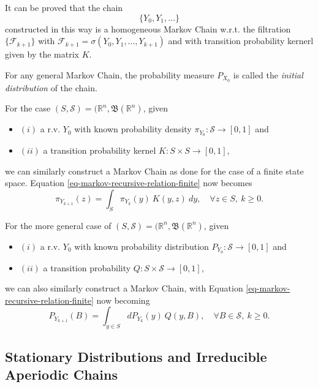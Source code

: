 It can be proved that the chain
\begin{equation*}
\{Y_0,Y_1,\ldots\}
\end{equation*}
constructed in this way is a homogeneous Markov Chain
w.r.t. the filtration $\{\mathcal{F}_{k+1}\}$ with $\mathcal{F}_{k+1}=\sigma(Y_0,Y_1,\ldots,Y_{k+1})$ and
with transition probability kernerl given by the matrix $K$.

For any general Markov Chain, the probability measure $P_{X_0}$ is called the {\it initial distribution} of the chain.

For the case $(S,\mathcal{S})=(\mathbb{R}^n,\mathfrak{B}(\mathbb{R}^n)$, given
{\renewcommand{\labelitemi}{}
\begin{itemize}
\item $(i)$ a r.v. $Y_0$ with known probability density $\pi_{Y_0}:\mathcal{S}\rightarrow [0,1]$ and
\item $(ii)$ a transition probability kernel $K:S\times S\rightarrow [0,1]$,
\end{itemize}
}
we can similarly construct a Markov Chain as done for the case of a finite state space.
Equation \eqref{eq-markov-recursive-relation-finite} now becomes
\begin{equation}\label{eq-markov-recursive-relation-Rac}
\pi_{Y_{k+1}}(z) = \int_{S}\pi_{Y_k}(y)~K(y,z)~dy,\quad\forall z\in S,~k\geqslant 0.
\end{equation}

For the more general case of $(S,\mathcal{S})=(\mathbb{R}^n,\mathfrak{B}(\mathbb{R}^n)$, given
{\renewcommand{\labelitemi}{}
\begin{itemize}
\item $(i)$ a r.v. $Y_0$ with known probability distribution $P_{Y_0}:\mathcal{S}\rightarrow [0,1]$ and
\item $(ii)$ a transition probability $Q:S\times\mathcal{S}\rightarrow [0,1]$,
\end{itemize}
}
we can also similarly construct a Markov Chain, with
Equation \eqref{eq-markov-recursive-relation-finite} now becoming
\begin{equation}\label{eq-markov-recursive-relation-R}
P_{Y_{k+1}}(B) = \int_{y\in S}dP_{Y_k}(y)~Q(y,B),\quad\forall B\in\mathcal{S},~k\geqslant 0.
\end{equation}

\subsection{Stationary Distributions and Irreducible Aperiodic Chains}

